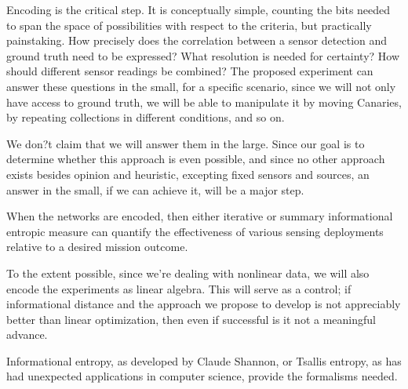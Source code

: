 \documentclass{article} %
\begin{document}
Encoding is the critical step. It is conceptually simple, counting the bits needed to span the space of possibilities with respect to the criteria, but practically painstaking. How precisely does the correlation between a sensor detection and ground truth need to be expressed? What resolution is needed for certainty? How should different sensor readings be combined? The proposed experiment can answer these questions  in the small, for a specific scenario, since we will not only have access to ground truth, we will be able to manipulate it by moving Canaries, by repeating collections in different conditions, and so on. 

We don?t claim that we will answer them in the large. Since our goal is to determine whether this approach is even possible, and since no other approach exists besides opinion and heuristic, excepting fixed sensors and sources, an answer in the small, if we can achieve it, will be a major step.

When the networks are encoded, then either iterative or summary informational entropic measure can quantify the effectiveness of various sensing deployments relative to a desired mission outcome. 

To the extent possible, since we're dealing with nonlinear data, we will also encode the experiments as linear algebra. This will serve as a control; if informational distance and the approach we propose to develop is not appreciably better than linear optimization, then even if successful is it not a meaningful advance.

Informational entropy, as developed by Claude Shannon, or Tsallis entropy, as has had unexpected applications in computer science, provide the formalisms needed.
\end{document}
